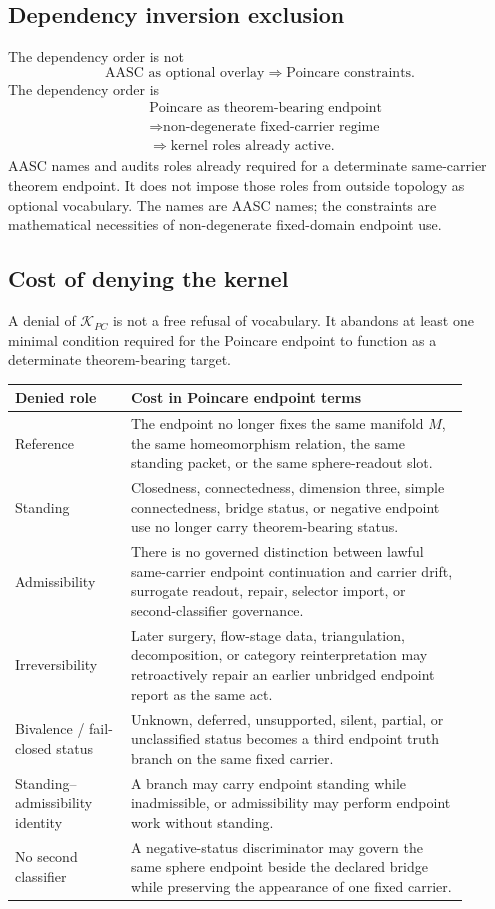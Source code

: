 \documentclass[11pt]{article}
\newcommand{\KPC}{\mathcal{K}_{PC}}
\begin{document}
\subsection*{Dependency inversion exclusion}
The dependency order is not
\[
\text{AASC as optional overlay}\Rightarrow\text{Poincare constraints}.
\]
The dependency order is
\[
\begin{aligned}
&\text{Poincare as theorem-bearing endpoint}\\
&\Rightarrow\text{non-degenerate fixed-carrier regime}\\
&\Rightarrow\text{kernel roles already active}.
\end{aligned}
\]
AASC names and audits roles already required for a determinate same-carrier theorem endpoint. It does not impose those roles from outside topology as optional vocabulary. The names are AASC names; the constraints are mathematical necessities of non-degenerate fixed-domain endpoint use.

\subsection*{Cost of denying the kernel}
A denial of \(\KPC\) is not a free refusal of vocabulary. It abandons at least one minimal condition required for the Poincare endpoint to function as a determinate theorem-bearing target.

\begin{longtable}{L{0.23\linewidth}L{0.67\linewidth}}
\toprule
\textbf{Denied role} & \textbf{Cost in Poincare endpoint terms}\\
\midrule
Reference & The endpoint no longer fixes the same manifold \(M\), the same homeomorphism relation, the same standing packet, or the same sphere-readout slot.\\
Standing & Closedness, connectedness, dimension three, simple connectedness, bridge status, or negative endpoint use no longer carry theorem-bearing status.\\
Admissibility & There is no governed distinction between lawful same-carrier endpoint continuation and carrier drift, surrogate readout, repair, selector import, or second-classifier governance.\\
Irreversibility & Later surgery, flow-stage data, triangulation, decomposition, or category reinterpretation may retroactively repair an earlier unbridged endpoint report as the same act.\\
Bivalence / fail-closed status & Unknown, deferred, unsupported, silent, partial, or unclassified status becomes a third endpoint truth branch on the same fixed carrier.\\
Standing--admissibility identity & A branch may carry endpoint standing while inadmissible, or admissibility may perform endpoint work without standing.\\
No second classifier & A negative-status discriminator may govern the same sphere endpoint beside the declared bridge while preserving the appearance of one fixed carrier.\\
\bottomrule
\end{longtable}
\end{document}
